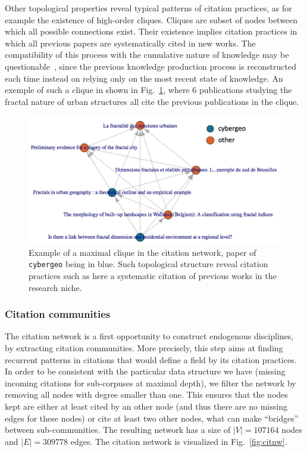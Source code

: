 Other topological properties reveal typical patterns of citation practices, as for example the existence of high-order cliques. Cliques are subset of nodes between which all possible connections exist. Their existence implies citation practices in which all previous papers are systematically cited in new works. The compatibility of this process with the cumulative nature of knowledge may be questionable~\citep{pumain2005cumulativite}, since the previous knowledge production process is reconstructed each time instead on relying only on the most recent state of knowledge. An exemple of such a clique in shown in Fig.~\ref{fig:cliques}, where 6 publications studying the fractal nature of urban structures all cite the previous publications in the clique.



\begin{figure}
\includegraphics[width=\textwidth]{figures/Fig4.jpg}
\caption{Example of a maximal clique in the citation network, paper of \texttt{cybergeo} being in blue. Such topological structure reveal citation practices such as here a systematic citation of previous works in the research niche.}
\label{fig:cliques}
\end{figure}



\subsubsection*{Citation communities}

The citation network is a first opportunity to construct endogenous disciplines, by extracting citation communities. More precisely, this step aims at finding recurrent patterns in citations that would define a field by its citation practices. In order to be consistent with the particular data structure we have (missing incoming citations for sub-corpuses at maximal depth), we filter the network by removing all nodes with degree smaller than one. This ensures that the nodes kept are either at least cited by an other node (and thus there are no missing edges for these nodes) or cite at least two other nodes, what can make ``bridges'' between sub-communities. The resulting network has a size of $\left|V\right| = 107164$ nodes and $\left|E\right| = 309778$ edges. The citation network is visualized in Fig.~\ref{fig:citnw}.



